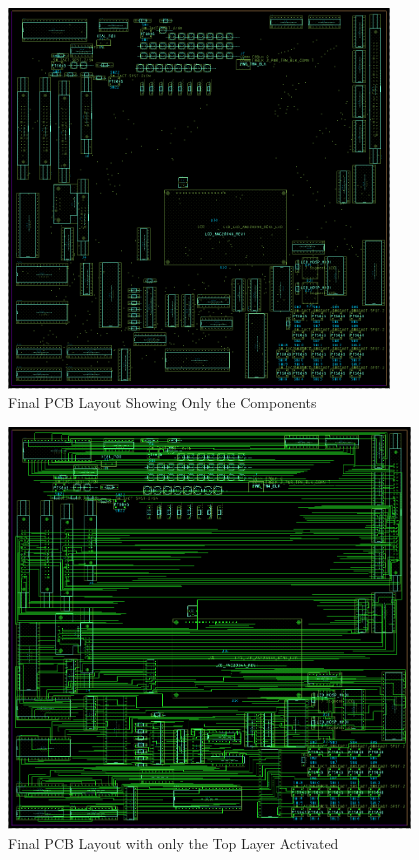 \begin{appendices}
        \begin{figure}[ht]
            \begin{center}
                \includegraphics[width=0.9\textwidth]{figures/main.png}
                \caption{Final PCB Layout Showing Only the Components} \label{fig:main}
            \end{center}
        \end{figure}

        \begin{figure}[ht]
            \begin{center}
                \includegraphics[width=0.95\textwidth]{figures/top.png}
                \caption{Final PCB Layout with only the Top Layer Activated} \label{fig:top}
            \end{center}
        \end{figure}


\end{appendices}
